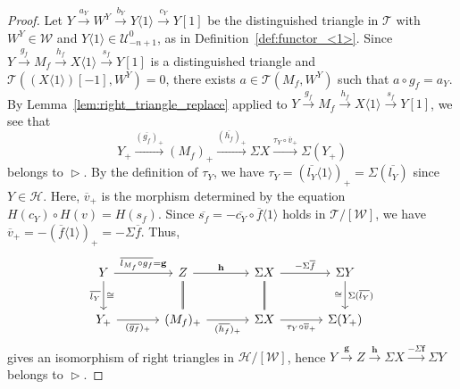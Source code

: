 \documentclass[a4paper,reqno,10pt]{amsart}
\theoremstyle{definition}
\theoremstyle{definition}
\theoremstyle{definition}
\theoremstyle{definition}
\theoremstyle{plain}
\newcommand{\CH}{\mathcal{H}}
\newcommand{\CT}{\mathcal{T}}
\newcommand{\CU}{\mathcal{U}}
\newcommand{\CW}{\mathcal{W}}
\begin{document}
\begin{proof}
Let 
$Y\xrightarrow{a_Y}W^Y\xrightarrow{b_Y}Y\langle 1\rangle\xrightarrow{c_Y}Y[1]$
be the distinguished triangle in $\CT$ with $W^Y\in\CW$ and $Y\langle1\rangle\in\CU_{-n+1}^0$, as in Definition~\ref{def:functor_<1>}.
Since $Y\xrightarrow{g_f}M_f\xrightarrow{h_f}X\langle1\rangle\xrightarrow{s_f}Y[1]$ is a distinguished triangle and 
\color{blue}
$\CT((X\langle1\rangle)[-1],W^Y)=0$, 
\normalcolor
there exists $a\in\CT(M_f,W^Y)$ such that $a\circ g_f=a_Y$. 
By Lemma~\ref{lem:right_triangle_replace} applied to $Y\xrightarrow{g_f}M_f\xrightarrow{h_f}X\langle1\rangle\xrightarrow{s_f}Y[1]$, we see that
\[
Y_+\xrightarrow{(\overline{g_f})_+}(M_f)_+\xrightarrow{(\overline{h_f})_+}\Sigma X\xrightarrow{\tau_Y\circ\overline{v}_+}\Sigma(Y_+)
\] belongs to $\vartriangleright$.
By the definition of $\tau_Y$, we have $\tau_Y=(\overline{l_Y}\langle1\rangle)_+=\Sigma(\overline{l_Y})$ since $Y\in\CH$. Here, $\overline{v}_+$ is the morphism determined by the equation $H(c_Y)\circ H(v)=H(s_f)$. Since $\overline{s_f}=-\overline{c_Y}\circ\overline{f}\langle1\rangle$ holds in $\CT/[\CW]$, we have $\overline{v}_+=-(\overline{f}\langle1\rangle)_+=-\Sigma\overline{f}$.
Thus, 
\[
\begin{tikzcd}[row sep=0.8cm, column sep=1.2cm]
Y\arrow[r, "\overline{l_{M_f}\circ g_f}=\mathbf{g}"]
  \arrow[d, "\overline{l_Y}" swap, "\cong"]
&Z\arrow[d, double, no head]
  \arrow[r, "\mathbf{h}"]
&\Sigma X\arrow[d, double, no head]
  \arrow[r, "-\Sigma\overline{f}"]
&\Sigma Y\arrow[d, "\cong" swap, "\Sigma(\overline{l_Y})"]
\\
Y_+\arrow[r, swap, "(\overline{g_f})_+"]
&(M_f)_+ \arrow[r, swap, "(\overline{h_f})_+"]
&\Sigma X \arrow[r, swap, "\tau_Y\circ\overline{v}_+"]
&\Sigma(Y_+)
\end{tikzcd}
\]
gives an isomorphism of right triangles in $\CH/[\CW]$, hence $Y\xrightarrow{\mathbf{g}}Z\xrightarrow{\mathbf{h}}\Sigma X\xrightarrow{-\Sigma\mathbf{f}}\Sigma Y$ belongs to $\vartriangleright$.
\normalcolor
\end{proof}
\end{document}
